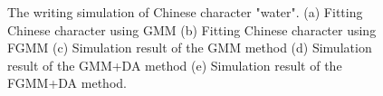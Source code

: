 \documentclass[conference]{IEEEtran}
\begin{document}
\begin{figure}[!t]
    \centering
    \quad
    \caption{The writing simulation of Chinese character "water". (a) Fitting Chinese character using GMM (b) Fitting Chinese character using FGMM (c) Simulation result of the GMM method (d) Simulation result of the GMM+DA method (e) Simulation result of the FGMM+DA method.}
    \label{fig5}
\end{figure}
\end{document}
